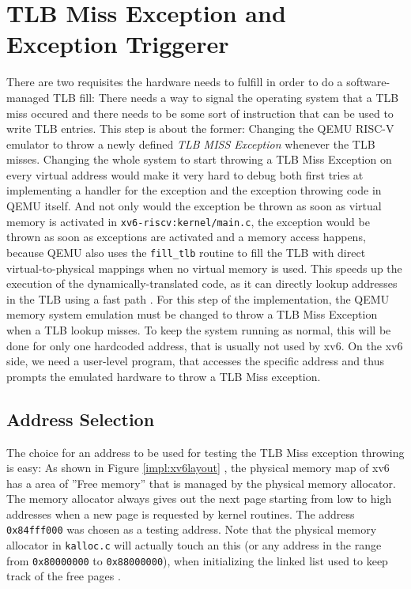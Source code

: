 \section{TLB Miss Exception and Exception Triggerer }
There are two requisites the hardware needs to fulfill in order to do a software-managed TLB fill:
There needs a way to signal the operating system that a TLB miss occured and there needs to be some
sort of instruction that can be used to write TLB entries.
This step is about the former: Changing the QEMU RISC-V emulator to throw a newly defined \textit{
    TLB MISS Exception} whenever the TLB misses.
Changing the whole system to start throwing a TLB Miss Exception on every virtual address would
make it very hard to debug both first tries at implementing a handler for the exception and the
exception throwing code in QEMU itself.
And not only would the exception be thrown as soon as virtual memory is activated in
\texttt{xv6-riscv:kernel/main.c}, the exception would be thrown
as soon as exceptions are activated and a memory access happens, because QEMU also uses the
\texttt{fill\_tlb} routine to fill the TLB with direct
virtual-to-physical mappings when no virtual memory is used. This speeds up the execution of
the dynamically-translated code, as it can directly
lookup addresses in the TLB using a fast path \cite{DeepDiveQEMU}. 
For this step of the implementation, the QEMU memory system emulation must be changed to throw a
TLB Miss Exception when a TLB lookup misses. To keep the system running as normal, this will
be done for only one hardcoded address, that is usually not used by xv6.
On the xv6 side, we need a user-level program, that accesses the specific address and thus prompts
the emulated hardware to throw a TLB Miss exception.


\subsection{Address Selection}
The choice for an address to be used for testing the TLB Miss exception throwing is easy:
As shown in Figure \ref{impl:xv6layout} \cite{cox2011xv6}, the physical memory map of xv6 has a
area of ''Free memory'' that is managed by the physical memory allocator. The memory allocator
always gives out the next page starting from low to high addresses when a new page is requested
by kernel routines. The address \texttt{0x84fff000} was chosen as a testing address.
Note that the physical memory allocator in \texttt{kalloc.c} will actually touch an this (or
any address in the range from \texttt{0x80000000} to \texttt{0x88000000}), when initializing
the linked list used to keep track of the free pages \cite{cox2011xv6}.


